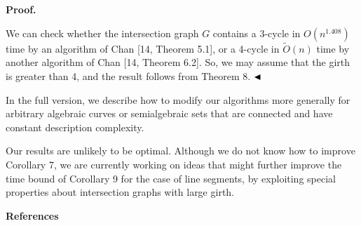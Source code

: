 \documentclass[10pt,a4paper]{article}
\begin{document}
\par\medskip\noindent\textbf{Proof.}\par
We can check whether the intersection graph $G$ contains a 3-cycle in $O(n^{1.408})$ time by an algorithm of Chan [14, Theorem 5.1], or a 4-cycle in $\widetilde{O}(n)$ time by another algorithm of Chan [14, Theorem 6.2]. So, we may assume that the girth is greater than 4, and the result follows from Theorem 8. $\hfill\blacktriangleleft$
\par
\par
In the full version, we describe how to modify our algorithms more generally for arbitrary algebraic curves or semialgebraic sets that are connected and have constant description complexity.
\par
\par
Our results are unlikely to be optimal. Although we do not know how to improve Corollary 7, we are currently working on ideas that might further improve the time bound of Corollary 9 for the case of line segments, by exploiting special properties about intersection graphs with large girth.
\par
\par
\par\medskip\noindent\textbf{References}\par
\end{document}
